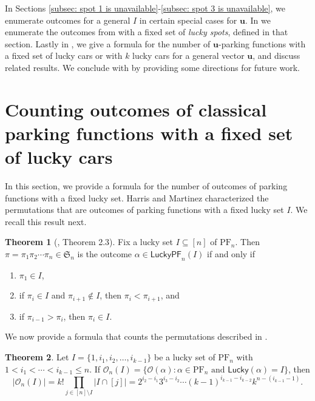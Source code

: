 \documentclass[reqno]{amsart}
\newcommand{\Sym}{\mathfrak{S}}
\newcommand{\LPF}{\mathsf{LuckyPF}}
\newcommand{\PF}{\mathrm{PF}}
\newcommand{\Lucky}{\mathsf{Lucky}}
\theoremstyle{definition}
\newtheorem{theorem}{Theorem}[section]
\theoremstyle{remark}
\newcommand{\out}{\mathcal{O}}
\newcommand{\bsy}{\boldsymbol}
\begin{document}
In Sections \ref{subsec: spot 1 is unavailable}-\ref{subsec: spot 3 is unavailable}, we enumerate outcomes for a general $I$ in certain special cases for $\bsy u$. In  we enumerate the outcomes from  with a fixed set of \emph{lucky spots}, defined in that section. Lastly in , we give a formula for the number of $\bsy u$-parking functions with a fixed set of lucky cars or with $k$ lucky cars for a general vector $\bsy u$, and discuss related results. We conclude with  by providing some directions for future work. 


\setcounter{section}{1}
\section{Counting outcomes of classical parking functions with a fixed set of lucky cars}

In this section, we provide a formula for the number of outcomes of parking functions with a fixed lucky set. Harris and Martinez characterized the permutations that are outcomes of parking functions with a fixed lucky set $I$. We recall this result next.


\begin{theorem}[\cite{harrismartinez}, Theorem 2.3]\label{thm:characterizing outcomes}
Fix a lucky set $I\subseteq[n]$ of $\PF_n$. 
Then $\pi=\pi_1\pi_2\cdots\pi_n\in \Sym_n$ is the outcome $\alpha\in\LPF_n(I)$
if and only if 
\begin{enumerate}
    \item $\pi_1\in I$,
    \item if $\pi_i\in I$ and $\pi_{i+1}\notin I$, then $\pi_i<\pi_{i+1}$, and 
    \item if $\pi_{i-1}>\pi_{i}$, then $\pi_{i}\in I$.
\end{enumerate}
\end{theorem}

We now provide a formula that counts the permutations described in .

\begin{theorem}\label{thm:count for outcomes}
Let $I = \{1, i_1, i_2, \ldots, i_{k-1}\}$ be a lucky set of $\PF_n$ with $1<i_1 <\cdots < i_{k-1} \leq n$. If $\out_n(I)=\{\out(\alpha):\alpha\in\PF_n\mbox{ and }\Lucky(\alpha)=I\}$, then
\[
|\out_n(I)|=k! \prod_{j\in [n]\setminus I} |I\cap [j]| = 2^{i_2-i_1} 3^{i_3-i_2} \cdots (k-1)^{i_{k-1} - i_{k-2}} k^{n -(i_{k-1}-1)}.
\]
\end{theorem}
\end{document}
